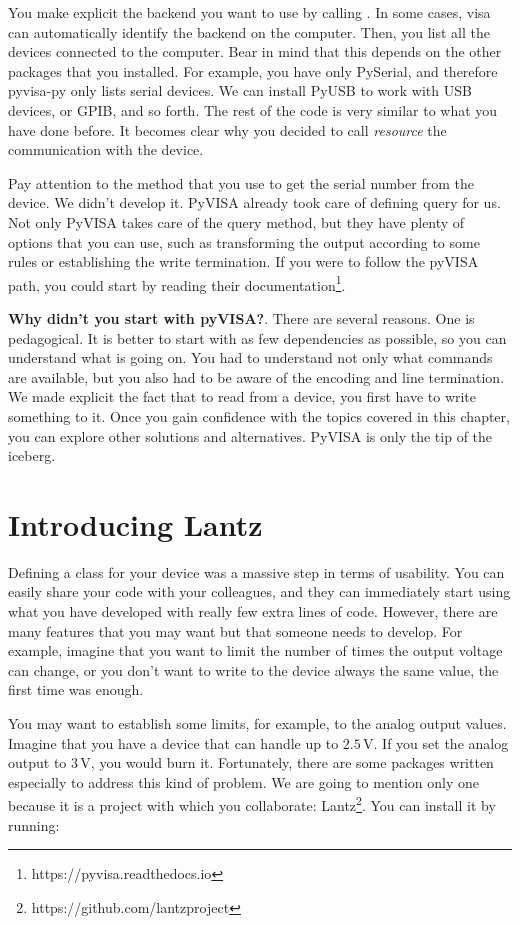 \sloppy You make explicit the backend you want to use by calling . In some cases, visa can automatically identify the backend on the computer. Then, you list all the devices connected to the computer. Bear in mind that this depends on the other packages that you installed. For example, you have only PySerial, and therefore pyvisa-py only lists serial devices. We can install PyUSB to work with USB devices, or GPIB, and so forth. The rest of the code is very similar to what you have done before. It becomes clear why you decided to call \emph{resource} the communication with the device.

Pay attention to the  method that you use to get the serial number from the device. We didn't develop it. PyVISA already took care of defining query for us. Not only PyVISA takes care of the query method, but they have plenty of options that you can use, such as transforming the output according to some rules or establishing the write termination. If you were to follow the pyVISA path, you could start by reading their documentation\footnote{https://pyvisa.readthedocs.io}.

\textbf{Why didn't you start with pyVISA?}. There are several reasons. One is pedagogical. It is better to start with as few dependencies as possible, so you can understand what is going on. You had to understand not only what commands are available, but you also had to be aware of the encoding and line termination. We made explicit the fact that to read from a device, you first have to write something to it. Once you gain confidence with the topics covered in this chapter, you can explore other solutions and alternatives. PyVISA is only the tip of the iceberg.

\section{Introducing Lantz}\label{sec:lantz}
Defining a class for your device was a massive step in terms of usability. You can easily share your code with your colleagues, and they can immediately start using what you have developed with really few extra lines of code. However, there are many features that you may want but that someone needs to develop. For example, imagine that you want to limit the number of times the output voltage can change, or you don't want to write to the device always the same value, the first time was enough.

You may want to establish some limits, for example, to the analog output values. Imagine that you have a device that can handle up to $2.5\,\textrm{V}$. If you set the analog output to $3\,\textrm{V}$, you would burn it. Fortunately, there are some packages written especially to address this kind of problem. We are going to mention only one because it is a project with which you collaborate: Lantz\footnote{https://github.com/lantzproject}. You can install it by running:

